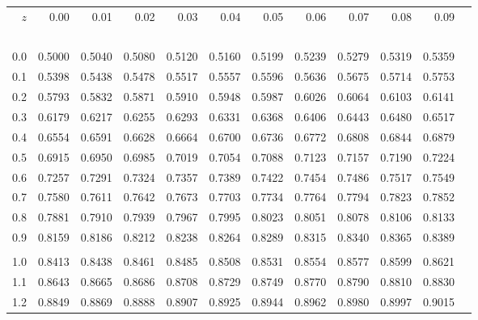 \documentclass[12pt,twoside,a4paper]{article}
\begin{document}
\begin{center}


\renewcommand{\arraystretch}{0.8}
\small
\begin{tabular}{rr@{\ }r@{\ }r@{\ }r@{\ }r@{\ }r@{\ }r@{\ }r@{\ }r@{\ }r@{\ }r}
$z$&0.00&0.01&0.02&0.03&0.04&0.05&0.06&0.07&0.08&0.09\\
\ \\
0.0&0.5000&0.5040&0.5080&0.5120&0.5160&0.5199&0.5239&0.5279&0.5319&0.5359\\
0.1&0.5398&0.5438&0.5478&0.5517&0.5557&0.5596&0.5636&0.5675&0.5714&0.5753\\
0.2&0.5793&0.5832&0.5871&0.5910&0.5948&0.5987&0.6026&0.6064&0.6103&0.6141\\
0.3&0.6179&0.6217&0.6255&0.6293&0.6331&0.6368&0.6406&0.6443&0.6480&0.6517\\
0.4&0.6554&0.6591&0.6628&0.6664&0.6700&0.6736&0.6772&0.6808&0.6844&0.6879\\
0.5&0.6915&0.6950&0.6985&0.7019&0.7054&0.7088&0.7123&0.7157&0.7190&0.7224\\
0.6&0.7257&0.7291&0.7324&0.7357&0.7389&0.7422&0.7454&0.7486&0.7517&0.7549\\
0.7&0.7580&0.7611&0.7642&0.7673&0.7703&0.7734&0.7764&0.7794&0.7823&0.7852\\
0.8&0.7881&0.7910&0.7939&0.7967&0.7995&0.8023&0.8051&0.8078&0.8106&0.8133\\
0.9&0.8159&0.8186&0.8212&0.8238&0.8264&0.8289&0.8315&0.8340&0.8365&0.8389\\
\\
1.0&0.8413&0.8438&0.8461&0.8485&0.8508&0.8531&0.8554&0.8577&0.8599&0.8621\\
1.1&0.8643&0.8665&0.8686&0.8708&0.8729&0.8749&0.8770&0.8790&0.8810&0.8830\\
1.2&0.8849&0.8869&0.8888&0.8907&0.8925&0.8944&0.8962&0.8980&0.8997&0.9015\\

\end{tabular}
\end{center}
\end{document}
